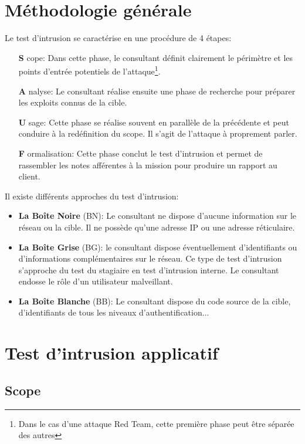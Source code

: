 \documentclass[twoside,a4paper,12pt,titlepage]{book}
\begin{document}
\section{Méthodologie générale}
Le test d'intrusion se caractérise en une procédure de 4 étapes:
\begin{itemize}
\item[\textbf{S}]cope: Dans cette phase, le consultant définit clairement le périmètre et les points d'entrée potentiels de l'attaque\footnote{Dans le cas d'une attaque Red Team, cette première phase peut être séparée des autres}.
\item[\textbf{A}]nalyse: Le consultant réalise ensuite une phase de recherche pour préparer les exploits connus de la cible.
\item[\textbf{U}]sage: Cette phase se réalise souvent en parallèle de la précédente et peut conduire à la redéfinition du scope. Il s'agit de l'attaque à proprement parler.
\item[\textbf{F}]ormalisation: Cette phase conclut le test d'intrusion et permet de rassembler les notes afférentes à la mission pour produire un rapport au client. 
\end{itemize}
Il existe différents approches du test d'intrusion:\begin{itemize}
	\item \textbf{La Boîte Noire} (BN): Le consultant ne dispose d'aucune information sur le réseau ou la cible. Il ne possède qu'une adresse IP ou une adresse réticulaire.
	\item \textbf{La Boîte Grise} (BG): le consultant dispose éventuellement d'identifiants ou d'informations complémentaires sur le réseau. Ce type de test d'intrusion s'approche du test du stagiaire en test d'intrusion interne. Le consultant endosse le rôle d'un utilisateur malveillant.
	\item \textbf{La Boîte Blanche} (BB): Le consultant dispose du code source de la cible, d'identifiants de tous les niveaux d'authentification...
\end{itemize}


\section{Test d'intrusion applicatif}
\subsection{Scope}\label{Scope}
\end{document}
